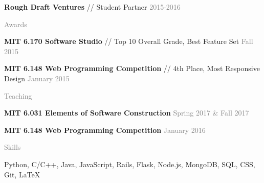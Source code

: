 \documentclass[11pt]{article}
\newcommand{\rsection}[1]{\vspace{1.5em}\textcolor{gray}{\Large \robotoslab #1}\vspace{0.5em}}
\newcommand{\bt}[1]{\textbf{#1}} %
\newcommand{\gap}[0]{\vspace{0.3em}} %
\newcommand{\sep}[0]{ // } %
\newcommand{\gray}[1]{\textcolor{gray}{#1}}
\begin{document}
\bt{Rough Draft Ventures}\sep Student Partner \hfill \gray{2015-2016}


\rsection{Awards}

\bt{MIT 6.170 Software Studio} \sep Top 10 Overall Grade, Best Feature Set \hfill \gray{Fall 2015}

\gap

\bt{MIT 6.148 Web Programming Competition} \sep 4th Place, Most Responsive Design \hfill \gray{January 2015}


\rsection{Teaching}

\bt{MIT 6.031 Elements of Software Construction} \hfill \gray{Spring 2017 \& Fall 2017}

\gap

\bt{MIT 6.148 Web Programming Competition} \hfill \gray{January 2016}


\rsection{Skills}

Python, C/C++, Java, JavaScript, Rails, Flask, Node.js, MongoDB, SQL, CSS, Git, {\selectfont\LaTeX}
\end{document}
